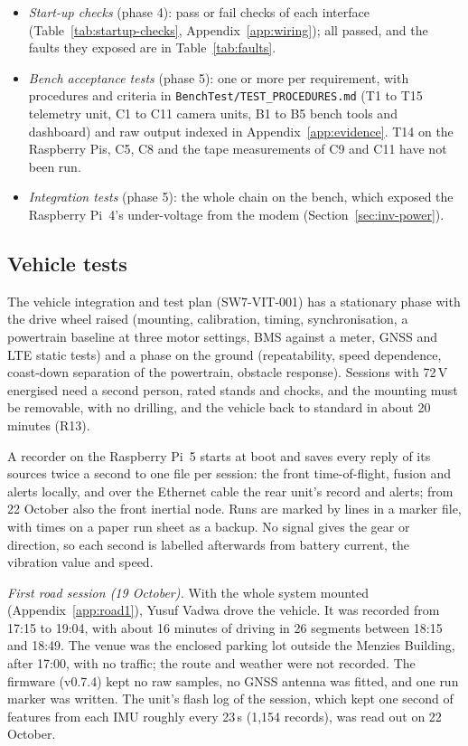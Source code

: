 \begin{itemize}
\item \emph{Start-up checks} (phase 4): pass or fail checks of each interface (Table~\ref{tab:startup-checks}, Appendix~\ref{app:wiring}); all passed, and the faults they exposed are in Table~\ref{tab:faults}.
\item \emph{Bench acceptance tests} (phase 5): one or more per requirement, with procedures and criteria in \texttt{BenchTest/\allowbreak{}TEST\_\allowbreak{}PROCEDURES.md} (T1 to T15 telemetry unit, C1 to C11 camera units, B1 to B5 bench tools and dashboard) and raw output indexed in Appendix~\ref{app:evidence}. T14 on the Raspberry Pis, C5, C8 and the tape measurements of C9 and C11 have not been run.
\item \emph{Integration tests} (phase 5): the whole chain on the bench, which exposed the Raspberry Pi~4's under-voltage from the modem (Section~\ref{sec:inv-power}).
\end{itemize}

\subsection{Vehicle tests}
\label{sec:full-system-integration}
\label{sec:field-test-design}

The vehicle integration and test plan (SW7-VIT-001) has a stationary phase with the drive wheel raised (mounting, calibration, timing, synchronisation, a powertrain baseline at three motor settings, BMS against a meter, GNSS and LTE static tests) and a phase on the ground (repeatability, speed dependence, coast-down separation of the powertrain, obstacle response). Sessions with 72\,V energised need a second person, rated stands and chocks, and the mounting must be removable, with no drilling, and the vehicle back to standard in about 20 minutes (R13).

A recorder on the Raspberry Pi~5 starts at boot and saves every reply of its sources twice a second to one file per session: the front time-of-flight, fusion and alerts locally, and over the Ethernet cable the rear unit's record and alerts; from 22 October also the front inertial node. Runs are marked by lines in a marker file, with times on a paper run sheet as a backup. No signal gives the gear or direction, so each second is labelled afterwards from battery current, the vibration value and speed.

\emph{First road session (19 October).} With the whole system mounted (Appendix~\ref{app:road1}), Yusuf Vadwa drove the vehicle. It was recorded from 17:15 to 19:04, with about 16 minutes of driving in 26 segments between 18:15 and 18:49. The venue was the enclosed parking lot outside the Menzies Building, after 17:00, with no traffic; the route and weather were not recorded. The firmware (v0.7.4) kept no raw samples, no GNSS antenna was fitted, and one run marker was written. The unit's flash log of the session, which kept one second of features from each IMU roughly every 23\,s (1,154 records), was read out on 22 October.


